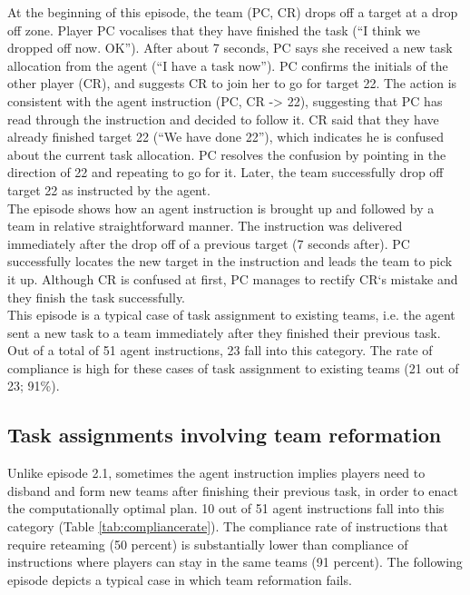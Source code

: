 At the beginning of this episode, the team (PC, CR) drops off a target at a drop off zone. Player PC vocalises that they have finished the task (``I think we dropped off now. OK'').  After about 7 seconds, PC says she received a new task allocation from the agent (``I have a task now''). PC confirms the initials of the other player (CR), and suggests CR to join her to go for target 22. The action is consistent with the agent instruction (PC, CR -> 22), suggesting that PC has read through the instruction and decided to follow it. CR said that they have already finished target 22 (``We have done 22''), which indicates he is confused about the current task allocation. PC resolves the confusion by pointing in the direction of 22 and repeating to go for it. Later, the team successfully drop off target 22 as instructed by the agent.\\

The episode shows how an agent instruction is brought up and followed by a team in relative straightforward manner. The instruction was delivered immediately after the drop off of a previous target (7 seconds after). PC successfully locates the new target in the instruction and leads the team to pick it up. Although CR is confused at first, PC manages to rectify CR`s mistake and they finish the task successfully. \\

This episode is a typical case of task assignment to existing teams, i.e. the agent sent a new task to a team immediately after they finished their previous task. Out of a total of 51 agent instructions, 23 fall into this category. The rate of compliance is high for these cases of task assignment to existing teams (21 out of 23; 91\%). \\

\subsection{Task assignments involving team reformation}
Unlike episode 2.1, sometimes the agent instruction implies players need to disband and form new teams after finishing their previous task, in order to enact the computationally optimal plan. 10 out of 51 agent instructions fall into this category (Table \ref{tab:compliancerate}). The compliance rate of instructions that require reteaming (50 percent) is substantially lower than compliance of instructions where players can stay in the same teams (91 percent). The following episode depicts a typical case in which team reformation fails.\\

